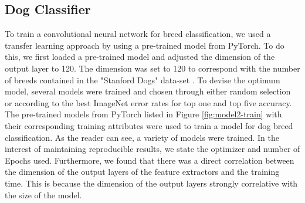 \documentclass{article}
\begin{document}
\newpage
\subsection{Dog Classifier}

To train a convolutional neural network for breed classification, we used a transfer learning approach by using a pre-trained model from PyTorch.  To do this, we first loaded a pre-trained model and adjusted the dimension of the output layer to 120. The dimension was set to 120 to correspond with the number of breeds contained in the  "Stanford Dogs" data-set \cite{stanforddogs}.  To devise the optimum model, several models were trained and chosen through either random selection or according to the best ImageNet error rates for top one and top five accuracy.  The pre-trained models from PyTorch \cite{torchpretrained} listed in Figure \ref{fig:model2-train} with their corresponding training attributes were used to train a model for dog breed classification.  As the reader can see, a variety of models were trained.  In the interest of maintaining reproducible results, we state the optimizer and number of Epochs used.  Furthermore, we found that there was a direct correlation between the dimension of the output layers of the feature extractors and the training time.  This is because the dimension of the output layers strongly correlative with the size of the model.
\end{document}
